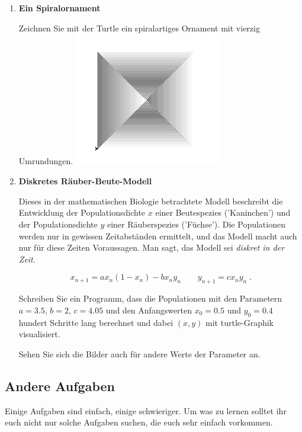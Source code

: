 \begin{enumerate}[1.]
\item \textbf{Ein Spiralornament}

Zeichnen Sie mit der Turtle ein spiralartiges Ornament
mit vierzig \glqq Umrundungen\grqq{}.
\includegraphics[width=0.5\textwidth]{spirale.png}



\item \textbf{Diskretes Räuber-Beute-Modell}

Dieses in der mathematischen Biologie betrachtete Modell beschreibt
die Entwicklung der Populationsdichte $x$ einer Beutespezies ('Kaninchen') und
der Populationsdichte $y$ einer Räuberspezies ('Füchse'). Die Populationen
werden nur in gewissen Zeitabständen ermittelt, und das Modell macht auch nur für diese Zeiten Voraussagen. Man sagt, das Modell sei {\em diskret in der Zeit}.

\[ x_{n+1} =  ax_n(1-x_n) - bx_ny_n \qquad y_{n+1} = cx_ny_n \;. \]

Schreiben Sie ein Programm, dass die Populationen mit den Parametern $a=3.5$, $b=2$, $c=4.05$ und den Anfangswerten
$x_0=0.5$ und $y_0=0.4$  hundert Schritte  lang berechnet und dabei $(x,y)$ mit turtle-Graphik visualisiert.

Sehen Sie sich die Bilder auch für andere Werte der Parameter an.


\end{enumerate}



\subsection*{Andere Aufgaben}

Einige Aufgaben sind einfach, einige schwieriger. Um was zu lernen solltet
ihr euch nicht nur solche Aufgaben suchen, die euch sehr einfach vorkommen.


